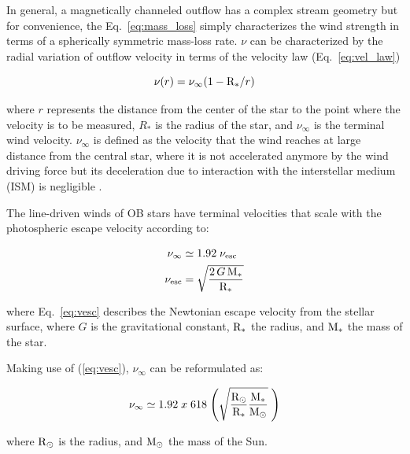 \documentclass[fleqn,usenatbib]{mnras}
\begin{document}
In general, a magnetically channeled outflow has a complex stream geometry but for convenience, the Eq.~\ref{eq:mass_loss} simply characterizes the wind strength in terms of a spherically symmetric mass-loss rate. $\nu$ can be characterized by the radial variation of outflow velocity in terms of the velocity law (Eq.~\ref{eq:vel_law})
\begin{ceqn}
\begin{equation}
    \nu(r) = \nu_\infty (1-\mathrm{R}_*/r) \label{eq:vel_law}
\end{equation}
\end{ceqn}
where $r$ represents the distance from the center of the star to the point where the velocity is to be measured, $R_*$ is the radius of the star, and $\nu_\infty$ is the terminal wind velocity. $\nu_\infty$ is defined as the velocity that the wind reaches at large distance from the central star, where it is not accelerated anymore by the wind driving force but its deceleration due to interaction with the interstellar medium (ISM) is negligible \citep{Niedzielski2002}.\par

The line-driven winds of OB stars have terminal velocities that scale with the photospheric escape velocity \citep{Lamers2000} according to:
\begin{ceqn}
\begin{align}
    \nu_\infty &\simeq 1.92 \;\nu_{{\rm esc}} \label{eq:vinf}\\
    \nu_{{\rm esc}} &= \sqrt{\frac{2\,G\,\mathrm{M}_*}{\mathrm{R}_*}} \label{eq:vesc}
\end{align}
\end{ceqn}
where Eq.~\ref{eq:vesc} describes the Newtonian escape velocity from the stellar surface, where $G$ is the gravitational constant,   ${\mathrm{R}_*}$ the radius, and ${\mathrm{M}_*}$ the mass of the star.

Making use of (\ref{eq:vesc}), $\nu_\infty$ can be reformulated as:

\begin{ceqn}
\begin{equation}
    \nu_\infty \simeq 1.92 \; x \; 618 \; \Bigg(\sqrt{\frac{\mathrm{R}_\odot}{\mathrm{R}_*}\frac{\mathrm{M}_*}{\mathrm{M}_\odot}} \;\Bigg) \label{eq:vinf}
\end{equation}
\end{ceqn}
where ${\mathrm{R}_\odot}$ is the radius, and ${\mathrm{M}_\odot}$ the mass of the Sun.
\end{document}
